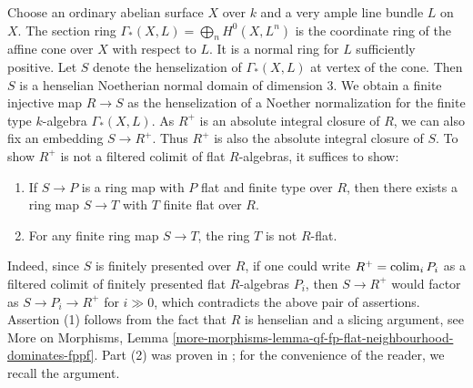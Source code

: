 \medskip\noindent
Choose an ordinary abelian surface $X$ over $k$ and a very ample line bundle
$L$ on $X$. The section ring $\Gamma_*(X, L) = \bigoplus_n H^0(X,L^n)$ is
the coordinate ring of the affine cone over $X$ with respect to $L$. It is
a normal ring for $L$ sufficiently positive. Let $S$ denote the henselization
of $\Gamma_*(X, L)$ at vertex of the cone. Then $S$ is a henselian Noetherian
normal domain of dimension $3$. We obtain a finite injective
map $R \to S$ as the henselization of a Noether normalization
for the finite type $k$-algebra $\Gamma_*(X, L)$. As $R^+$ is an
absolute integral closure of $R$, we can also fix an embedding $S \to R^+$.
Thus $R^+$ is also the absolute integral closure of $S$. To show $R^+$
is not a filtered colimit of flat $R$-algebras, it suffices to show:
\begin{enumerate}
\item If $S \to P$ is a ring map with $P$ flat and finite type over $R$,
then there exists a ring map $S \to T$ with $T$ finite flat over $R$.
\item For any finite ring map $S \to T$, the ring $T$ is not $R$-flat.
\end{enumerate}
Indeed, since $S$ is finitely presented over $R$, if one could write
$R^+ = \mathop{\mathrm{colim}}\nolimits_i P_i$ as a filtered colimit of finitely presented flat
$R$-algebras $P_i$, then $S \to R^+$ would factor as $S \to P_i \to R^+$
for $i \gg 0$, which contradicts the above pair of assertions.
Assertion (1) follows from the fact that $R$ is henselian and a
slicing argument, see More on Morphisms, Lemma
\ref{more-morphisms-lemma-qf-fp-flat-neighbourhood-dominates-fppf}.
Part (2) was proven in \cite{BhattSmallCMMod}; for the convenience of
the reader, we recall the argument.

